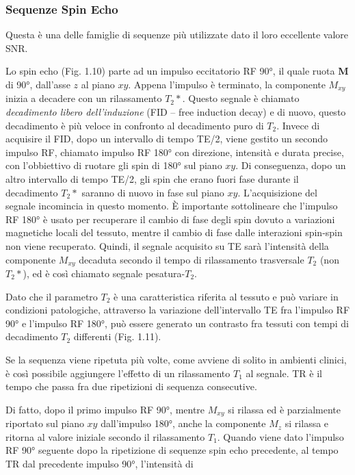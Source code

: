 \documentclass[leqno,10pt,twocolumn,a4paper]{article}
\begin{document}
	\subsubsection{Sequenze Spin Echo}
	Questa è una delle famiglie di sequenze più utilizzate dato il loro eccellente valore SNR. \par Lo spin echo (Fig. 1.10) parte ad un impulso eccitatorio RF 90°, il quale ruota \textbf{M} di 90°, dall'asse $z$ al piano
	$xy$. Appena l'impulso è  terminato, la componente $M_{xy}$ inizia a decadere con un rilassamento $T_2*$. Questo segnale è chiamato \textit{decadimento libero dell'induzione} (FID -- free induction decay)
	e di nuovo, questo decadimento è più veloce in confronto al decadimento puro di $T_2$. Invece di acquisire il FID, dopo un intervallo di tempo TE/2, viene gestito un secondo impulso RF, chiamato impulso
	RF 180° con direzione, intensità e durata precise, con l'obbiettivo di ruotare gli spin di 180° sul piano $xy$. Di conseguenza, dopo un altro intervallo di tempo TE/2, gli spin che erano fuori fase durante il
	decadimento $T_2*$ saranno di nuovo in fase sul piano $xy$. L'acquisizione del segnale incomincia in questo momento. È importante sottolineare che l'impulso RF 180° è usato per recuperare il cambio di fase
	degli spin dovuto a variazioni magnetiche locali del tessuto, mentre il cambio di fase dalle interazioni spin-spin non viene recuperato. Quindi, il segnale acquisito su TE sarà l'intensità della componente $M_{xy}$
	decaduta secondo il tempo di rilassamento trasversale $T_2$ (non $T_2*$), ed è così chiamato segnale pesatura-$T_2$. \par Dato che il parametro $T_2$ è una caratteristica riferita al tessuto e può variare
	in condizioni patologiche, attraverso la variazione dell'intervallo TE fra l'impulso RF 90° e l'impulso RF 180°, può essere generato un contrasto fra tessuti con tempi di decadimento $T_2$ differenti (Fig. 1.11).
	\par Se la sequenza viene ripetuta più volte, come avviene di solito in ambienti clinici, è così possibile aggiungere l'effetto di un rilassamento $T_1$ al segnale. TR è il tempo che passa fra due ripetizioni di
	sequenza consecutive. \par Di fatto, dopo il primo impulso RF 90°, mentre $M_{xy}$ si rilassa ed è parzialmente riportato sul piano $xy$ dall'impulso 180°, anche la componente $M_z$ si rilassa e ritorna
	al valore iniziale secondo il rilassamento $T_1$. Quando viene dato l'impulso RF 90° seguente dopo la ripetizione di sequenze spin echo precedente, al tempo TR dal precedente impulso 90°, l'intensità di 
\end{document}
